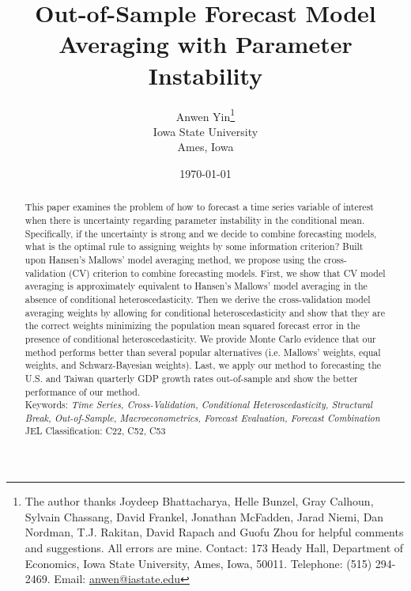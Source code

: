 \newtheorem{theorem}{Theorem}[section]
\newtheorem{lemma}[theorem]{Lemma}
\newtheorem{proposition}[theorem]{Proposition}
\newtheorem{corollary}[theorem]{Corollary}
\newtheorem{Assumption}{Assumption}

\title{Out-of-Sample Forecast Model Averaging with Parameter Instability}
\author{Anwen Yin\thanks{The author thanks Joydeep Bhattacharya, Helle Bunzel, Gray Calhoun, Sylvain Chassang, David Frankel, Jonathan McFadden, Jarad Niemi, Dan Nordman, T.J. Rakitan, David Rapach and Guofu Zhou for helpful comments and suggestions. All errors are mine. Contact: 173 Heady Hall, Department of Economics, Iowa State University, Ames, Iowa, 50011. Telephone: (515) 294-2469. Email: \href{mailto:anwen@iastate.edu}{anwen@iastate.edu}} \\ Iowa State University\\Ames, Iowa}
\date{\today}

\maketitle

\begin{abstract}
  \noindent This paper examines the problem of how to forecast a time series variable of interest when there is uncertainty regarding parameter instability in the conditional mean. Specifically, if the uncertainty is strong and we decide to combine forecasting models, what is the optimal rule to assigning weights by some information criterion? Built upon Hansen's Mallows' model averaging method, we propose using the cross-validation (CV) criterion to combine forecasting models. First, we show that CV model averaging is approximately equivalent to Hansen's Mallows' model averaging in the absence of conditional heteroscedasticity. Then we derive the cross-validation model averaging weights by allowing for conditional heteroscedasticity and show that they are the correct weights minimizing the population mean squared forecast error in the presence of conditional heteroscedasticity. We provide Monte Carlo evidence that our method performs better than several popular alternatives (i.e. Mallows' weights, equal weights, and Schwarz-Bayesian weights). Last, we apply our method to forecasting the U.S. and Taiwan quarterly GDP growth rates out-of-sample and show the better performance of our method.\\

  \noindent Keywords: \emph{Time Series, Cross-Validation, Conditional Heteroscedasticity, Structural Break, Out-of-Sample, Macroeconometrics, Forecast Evaluation, Forecast Combination}\\

  \noindent \textsc{JEL} Classification: C22, C52, C53
\end{abstract}
\newpage
\doublespacing